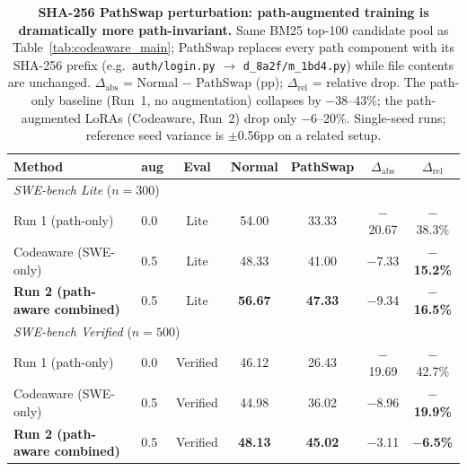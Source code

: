 \documentclass{article}
\begin{document}
\begin{table}[t]
\centering
\caption{\textbf{SHA-256 PathSwap perturbation: path-augmented training is dramatically more path-invariant.}
Same BM25 top-100 candidate pool as Table~\ref{tab:codeaware_main}; PathSwap replaces every path component with its SHA-256 prefix (e.g.\ \texttt{auth/login.py} $\rightarrow$ \texttt{d\_8a2f/m\_1bd4.py}) while file contents are unchanged.
$\Delta_{\text{abs}}$ = Normal $-$ PathSwap (pp); $\Delta_{\text{rel}}$ = relative drop.
The path-only baseline (Run~1, no augmentation) collapses by $-$38--43\%; the path-augmented LoRAs (Codeaware, Run~2) drop only $-$6--20\%.
Single-seed runs; reference seed variance is $\pm$0.56pp on a related setup.}
\label{tab:codeaware_invariance}
\small
\begin{tabular}{llccccc}
\toprule
\textbf{Method} & \textbf{aug} & \textbf{Eval} & \textbf{Normal} & \textbf{PathSwap} & \textbf{$\Delta_{\text{abs}}$} & \textbf{$\Delta_{\text{rel}}$} \\
\midrule
\multicolumn{7}{l}{\emph{SWE-bench Lite} ($n{=}300$)} \\
Run 1 (path-only)                       & 0.0 & Lite & 54.00 & 33.33 & $-$20.67 & $-$38.3\% \\
Codeaware (SWE-only)                    & 0.5 & Lite & 48.33 & 41.00 & $-$7.33 & $\boldsymbol{-}$\textbf{15.2\%} \\
\textbf{Run 2 (path-aware combined)}    & 0.5 & Lite & \textbf{56.67} & \textbf{47.33} & $-$9.34 & $\boldsymbol{-}$\textbf{16.5\%} \\
\midrule
\multicolumn{7}{l}{\emph{SWE-bench Verified} ($n{=}500$)} \\
Run 1 (path-only)                       & 0.0 & Verified & 46.12 & 26.43 & $-$19.69 & $-$42.7\% \\
Codeaware (SWE-only)                    & 0.5 & Verified & 44.98 & 36.02 & $-$8.96 & $\boldsymbol{-}$\textbf{19.9\%} \\
\textbf{Run 2 (path-aware combined)}    & 0.5 & Verified & \textbf{48.13} & \textbf{45.02} & $-$3.11 & $\boldsymbol{-}$\textbf{6.5\%} \\
\bottomrule
\end{tabular}
\end{table}
\end{document}
